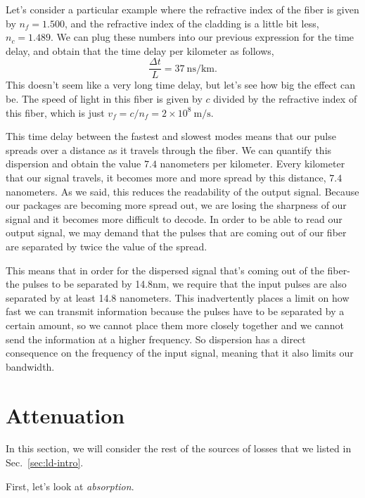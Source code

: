 Let's consider a particular example where the refractive index of the fiber is given by $n_f = 1.500$, and the refractive index of the cladding is a little bit less, $n_c = 1.489$. We can plug these numbers into our previous expression for the time delay, and obtain that the time delay per kilometer as follows,
\begin{equation}
\frac{\Delta t}{L}=37 \mathrm{~ns} / \mathrm{km}.
\end{equation}
This doesn't seem like a very long time delay, but let's see how big the effect can be. The speed of light in this fiber is given by $c$ divided by the refractive index of this fiber, which is just $v_f=c / n_f=2 \times 10^8 \mathrm{~m} / \mathrm{s}$.

This time delay between the fastest and slowest modes means that our pulse spreads over a distance as it travels through the fiber. We can quantify this dispersion and obtain the value $7.4$ nanometers per kilometer. Every kilometer that our signal travels, it becomes more and more spread by this distance, $7.4$ nanometers. As we said, this reduces the readability of the output signal. Because our packages are becoming more spread out, we are losing the sharpness of our signal and it becomes more difficult to decode. In order to be able to read our output signal, we may demand that the pulses that are coming out of our fiber are separated by twice the value of the spread.

This means that in order for the dispersed signal that's coming out of the fiber- the pulses to be separated by 14.8nm, we require that the input pulses are also separated by at least 14.8 nanometers. This inadvertently places a limit on how fast we can transmit information because the pulses have to be separated by a certain amount, so we cannot place them more closely together and we cannot send the information at a higher frequency. So dispersion has a direct consequence on the frequency of the input signal, meaning that it also limits our bandwidth.



\section{Attenuation}
\label{sec:11-3_attenuation}

In this section, we will consider the rest of the sources of losses that we listed in Sec.~\ref{sec:ld-intro}.

First, let's look at \emph{absorption}.

